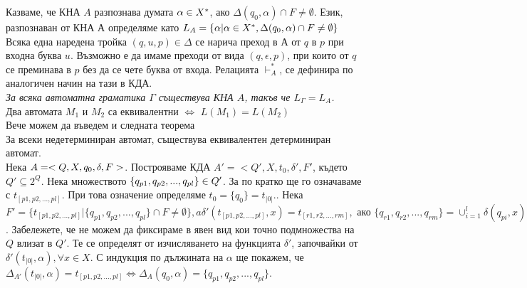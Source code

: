 \documentclass[11pt]{article}
\begin{document}
 Казваме, че КНА $A$ разпознава думата $\alpha \in X^{*}$, ако $\Delta(q_{0}, \alpha) \cap F \neq \emptyset$. Език, разпознаван от КНА $А$ определяме като $L_{A} = \{\alpha|\alpha \in X^{*}, \Delta(q_{0}, \alpha)\cap F \neq \emptyset \}$\\

Всяка една наредена тройка $(q, u, p) \in \Delta$ се нарича преход в $А$ от $q$ в $p$ при входна буква $u$. Възможно е да имаме преходи от вида $(q, \epsilon, p)$, при които от $q$ се преминава в $p$ без да се чете буква от входа. Релацията $\vdash^{*}_{A}$, се дефинира по аналогичен начин на тази в КДА.\\

\theorem \emph{ За всяка автоматна граматика $\Gamma$ съществува КНА $A$, такъв че $L_{\Gamma} = L_{A}$.}\\

  Два автомата $M_{1}$ и $M_{2}$ са еквивалентни $\iff$ $L(M_{1}) = L(M_{2})$\\

Вече можем да въведем и следната теорема\\
 За всеки недетерминиран автомат, съществува еквивалентен детерминиран автомат.\\
 Нека $A = <Q, X, q_{0}, \delta, F>$. Построяваме КДА $A' = < Q', X, t_{0}, \delta', F'$, където $Q' \subseteq 2^{Q}$. Нека множеството $\{q_{p1}, q_{p2}, ..., q_{pl} \} \in Q'$. За по кратко ще го означаваме с $t_{[p1, p2,..., pl ]}$. При това означение определяме 
$t_{0} = \{q_{0}\} = t_{|0|}.$. Нека $F' = \{t_{[p1, p2, ..., pl]}|\{ q_{p1}, q_{p2}, ..., q_{pl} \} \cap F \neq \emptyset\}, a \delta'(t_{[p1, p2, ... ,pl]}, x) = t_{[r1, r2, ..., rm]}, \text{ ако } \{q_{r1}, q_{r2}, ..., q_{rm}\} = \cup_{i = 1}^{l}\delta(q_{pi}, x)$. Забележете, че не можем да фиксираме в явен вид кои точно подмножества на $Q$ влизат в $Q'$. Те се определят от изчисляването на функцията $\delta'$, започвайки от $\delta'(t_{|0|}, \alpha), \forall x \in X$. С индукция по дължината на $\alpha$ ще покажем, че $\Delta_{A'}(t_{|0|}, \alpha) = t_{[p1, p2, ..., pl]} \Leftrightarrow 
\Delta_{A}(q_{0}, \alpha) = \{q_{p1}, q_{p2}, ..., q_{pl}\}$.
\end{document}
